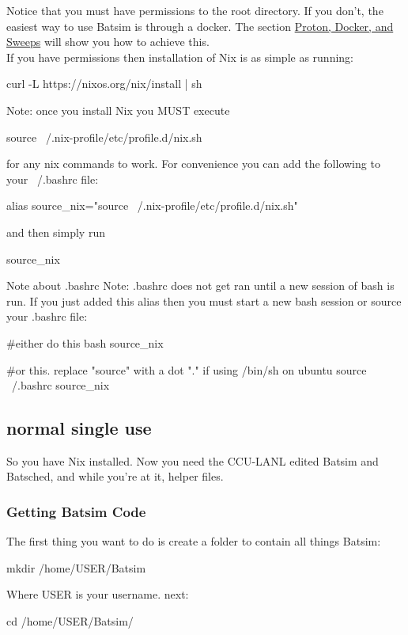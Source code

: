 \documentclass[titlepage]{article}
\newcommand\alertC{\faExclamationCircle}
\newenvironment{regular}{\color{black}}{}
\begin{document}
\begin{regular}
Notice that you must have permissions to the root directory.  If you don't, the easiest way to use Batsim is through a docker.
The section \hyperlink{howto_proton_docker_sweeps}{Proton, Docker, and Sweeps} will show you how to achieve this.\\

If you have permissions then installation of Nix is as simple as running:
\end{regular}

\begin{terminal}
curl -L https://nixos.org/nix/install | sh
\end{terminal}

Note: once you install Nix you MUST execute
\begin{terminal}
source ~/.nix-profile/etc/profile.d/nix.sh
\end{terminal}

for any nix commands to work.  For convenience you can add the following to your ~/.bashrc file:
\begin{terminal}
alias source_nix="source ~/.nix-profile/etc/profile.d/nix.sh"
\end{terminal}

and then simply run
\begin{terminal}
source_nix
\end{terminal}
\begin{explanation}{\alertC}{Note about .bashrc }
Note: .bashrc does not get ran until a new session of bash is run.  If you just added 
this alias then you must start a new bash session or source your .bashrc file:
\end{explanation}
\begin{terminal}
#either do this
bash
source_nix

#or this. replace "source" with a dot "." if using /bin/sh on ubuntu
source ~/.bashrc
source_nix
\end{terminal}


\subsection{normal single use}
\hypertarget{howto_normal_single_use}{}
So you have Nix installed.  Now you need the CCU-LANL edited Batsim and Batsched, and while you're at it, helper files.
\subsubsection{Getting Batsim Code}
The first thing you want to do is create a folder to contain all things Batsim:
\begin{terminal}
mkdir /home/USER/Batsim
\end{terminal}
Where USER is your username.  next:
\begin{terminal}
cd /home/USER/Batsim/
\end{terminal}
\end{document}
